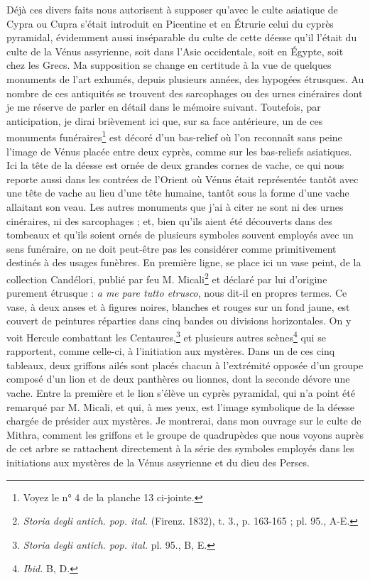 \documentclass{article}
\begin{document}
Déjà ces divers faits nous autorisent à supposer qu'avec le culte asiatique de Cypra ou Cupra s'était introduit en Picentine et en Étrurie celui du cyprès pyramidal, évidemment aussi inséparable du culte de cette déesse qu'il l'était du culte de la Vénus assyrienne, soit dans l'Asie occidentale, soit en Égypte, soit chez les Grecs. Ma supposition se change en certitude à la vue de quelques monuments de l'art exhumés, depuis plusieurs années, des hypogées étrusques. Au nombre de ces antiquités se trouvent des sarcophages ou des urnes cinéraires dont je me réserve de parler en détail dans le mémoire suivant. Toutefois, par anticipation, je dirai brièvement ici que, sur sa face antérieure, un de ces monuments funéraires\footnote{Voyez le n° 4 de la planche 13 ci-jointe.} est décoré d'un bas-relief où l'on reconnaît sans peine l'image de Vénus placée entre deux cyprès, comme sur les bas-reliefs asiatiques. Ici la tête de la déesse est ornée de deux grandes cornes de vache, ce qui nous reporte aussi dans les contrées de l'Orient où Vénus était représentée tantôt avec une tête de vache au lieu d'une tête humaine, tantôt sous la forme d'une vache allaitant son veau. Les autres monuments que j'ai à citer ne sont ni des urnes cinéraires, ni des sarcophages ; et, bien qu'ils aient été découverts dans des tombeaux et qu'ils soient ornés de plusieurs symboles souvent employés avec un sens funéraire, on ne doit peut-être pas les considérer comme primitivement destinés à des usages funèbres. En première ligne, se place ici un vase peint, de la collection Candélori, publié par feu M. Micali\footnote{\emph{Storia degli antich. pop. ital.} (Firenz. 1832), t. 3., p. 163-165 ; pl. 95., A-E.} et déclaré par lui d'origine purement étrusque : \emph{a me pare tutto etrusco}, nous dit-il en propres termes. Ce vase, à deux anses et à figures noires, blanches et rouges sur un fond jaune, est couvert de peintures réparties dans cinq bandes ou divisions horizontales. On y voit Hercule combattant les Centaures,\footnote{\emph{Storia degli antich. pop. ital.} pl. 95., B, E.} et plusieurs autres scènes\footnote{\emph{Ibid.} B, D.} qui se rapportent, comme celle-ci, à l'initiation aux mystères. Dans un de ces cinq tableaux, deux griffons ailés sont placés chacun à l'extrémité opposée d'un groupe composé d'un lion et de deux panthères ou lionnes, dont la seconde dévore une vache. Entre la première et le lion s'élève un cyprès pyramidal, qui n'a point été remarqué par M. Micali, et qui, à mes yeux, est l'image symbolique de la déesse chargée de présider aux mystères. Je montrerai, dans mon ouvrage sur le culte de Mithra, comment les griffons et le groupe de quadrupèdes que nous voyons auprès de cet arbre se rattachent directement à la série des symboles employés dans les initiations aux mystères de la Vénus assyrienne et du dieu des Perses.
\end{document}
